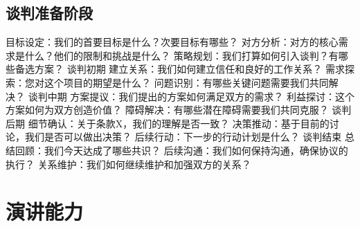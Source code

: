 \documentclass[12pt]{book}
\begin{document}
\subsection{谈判准备阶段}
目标设定：我们的首要目标是什么？次要目标有哪些？
对方分析：对方的核心需求是什么？他们的限制和挑战是什么？
策略规划：我们打算如何引入谈判？有哪些备选方案？
谈判初期
建立关系：我们如何建立信任和良好的工作关系？
需求探索：您对这个项目的期望是什么？
问题识别：有哪些关键问题需要我们共同解决？
谈判中期
方案提议：我们提出的方案如何满足双方的需求？
利益探讨：这个方案如何为双方创造价值？
障碍解决：有哪些潜在障碍需要我们共同克服？
谈判后期
细节确认：关于条款X，我们的理解是否一致？
决策推动：基于目前的讨论，我们是否可以做出决策？
后续行动：下一步的行动计划是什么？
谈判结束
总结回顾：我们今天达成了哪些共识？
后续沟通：我们如何保持沟通，确保协议的执行？
关系维护：我们如何继续维护和加强双方的关系？

\section{演讲能力}
\end{document}
